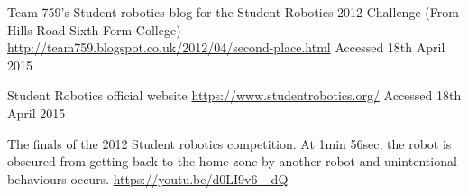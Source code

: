 \documentclass[10pt]{article}
\begin{document}
  \begin{thebibliography}{9}
     Team 759's Student robotics blog for the Student Robotics 2012 Challenge (From Hills Road Sixth Form College)\\
      \url{http://team759.blogspot.co.uk/2012/04/second-place.html} Accessed 18th April 2015

     Student Robotics official website
      \url{https://www.studentrobotics.org/} Accessed 18th April 2015

     The finals of the 2012 Student robotics competition. At 1min 56sec, the robot is obscured from getting back to the home zone by another robot and unintentional behaviours occurs.
      \url{https://youtu.be/d0LI9v6-_dQ}
  \end{thebibliography}
\end{document}
